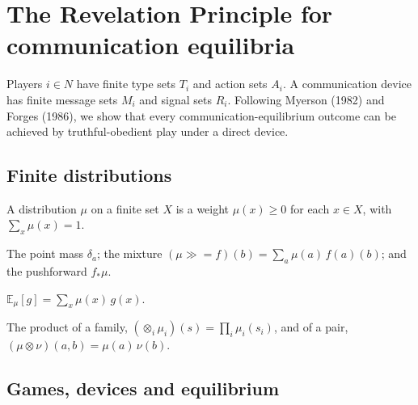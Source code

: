 
\chapter{The Revelation Principle for communication equilibria}

Players $i \in N$ have finite type sets $T_i$ and action sets $A_i$. A
communication device has finite message sets $M_i$ and signal sets $R_i$.
Following Myerson (1982) and Forges (1986), we show that every
communication-equilibrium outcome can be achieved by truthful-obedient play
under a direct device.

\section{Finite distributions}

\begin{definition}
  \label{def:findist}
  \leanok
  A distribution $\mu$ on a finite set $X$ is a weight $\mu(x) \ge 0$ for each
  $x \in X$, with $\sum_x \mu(x) = 1$.
\end{definition}

\begin{definition}
  \label{def:findist-ops}
  \leanok
  The point mass $\delta_a$; the mixture
  $(\mu \gg\!= f)(b) = \sum_a \mu(a)\, f(a)(b)$; and the pushforward
  $f_*\mu$.
\end{definition}

\begin{definition}[Expectation]
  \label{def:findist-E}
  \leanok
  $\mathbb{E}_\mu[g] = \sum_x \mu(x)\, g(x)$.
\end{definition}

\begin{definition}
  \label{def:findist-prod}
  \leanok
  The product of a family, $(\otimes_i \mu_i)(s) = \prod_i \mu_i(s_i)$, and of
  a pair, $(\mu \otimes \nu)(a,b) = \mu(a)\,\nu(b)$.
\end{definition}

\section{Games, devices and equilibrium}

